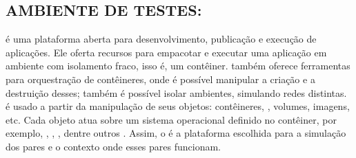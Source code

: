\subsection{AMBIENTE DE TESTES: }

 é uma plataforma aberta para desenvolvimento, publicação e execução de aplicações. Ele oferta recursos para empacotar e executar uma aplicação em ambiente com isolamento fraco, isso é, um contêiner.  também oferece ferramentas para orquestração de contêineres, onde é possível manipular a criação e a destruição desses; também é possível isolar ambientes, simulando redes distintas.  é usado a partir da manipulação de seus objetos: contêineres, , volumes, imagens, etc. Cada objeto atua sobre um sistema operacional definido no contêiner, por exemplo, , , , dentre outros \cite{DockerOverviewDocs}. Assim, o  é a plataforma escolhida para a simulação dos pares e o contexto onde esses pares funcionam.
